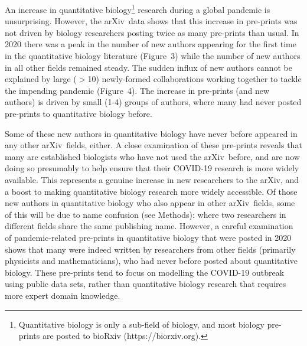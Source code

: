 \documentclass[a4paper,12pt]{article}
\newcommand{\arxiv}{arXiv}
\begin{document}
 
An increase in quantitative biology\footnote{Quantitative biology is only a sub-field of biology, and most biology pre-prints are posted to bioRxiv ({https://biorxiv.org}).} research during a global pandemic is unsurprising. However, the \arxiv\ data shows that this increase in pre-prints was not driven by biology researchers posting twice as many pre-prints than usual. In 2020 there was a peak in the number of new authors appearing for the first time in the quantitative biology literature (Figure~3) while the number of new authors in all other fields remained steady. The sudden influx of new authors cannot be explained by large ($>$10) newly-formed collaborations working together to tackle the impending pandemic (Figure~4). The increase in pre-prints (and new authors) is driven by small (1-4) groups of authors, where many had never posted pre-prints to quantitative biology before.


Some of these new authors in quantitative biology have never before appeared in any other \arxiv\ fields, either.
A close examination of these pre-prints reveals that many are established biologists who have not used the \arxiv\ before, and are now doing so presumably to help ensure that their COVID-19 research is more widely available. This represents a genuine increase in new researchers to the \arxiv, and a boost to making quantitative biology research more widely accessible. Of those new authors in quantitative biology who also appear in other \arxiv\ fields, some of this will be due to name confusion (see Methods): where two researchers in different fields share the same publishing name. However, a careful examination of pandemic-related pre-prints in quantitative biology that were posted in 2020 shows that many were indeed written by researchers from other fields (primarily physicists and mathematicians), who had never before posted about quantitative biology. These pre-prints tend to focus on modelling the COVID-19 outbreak using public data sets, rather than quantitative biology research that requires more expert domain knowledge. 


\end{document}
